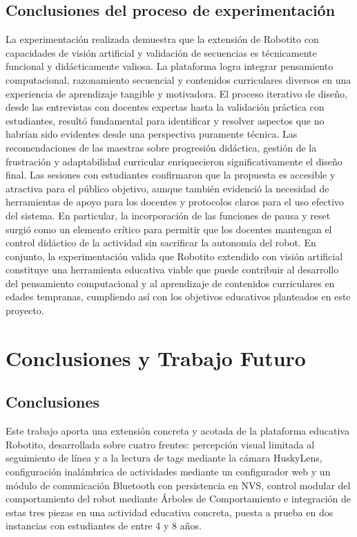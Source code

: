 \documentclass{prgrado}
\begin{document}
\section{Conclusiones del proceso de experimentación}
La experimentación realizada demuestra que la extensión de Robotito con capacidades de visión artificial y validación de secuencias es técnicamente funcional y didácticamente valiosa. La plataforma logra integrar pensamiento computacional, razonamiento secuencial y contenidos curriculares diversos en una experiencia de aprendizaje tangible y motivadora.
El proceso iterativo de diseño, desde las entrevistas con docentes expertas hasta la validación práctica con estudiantes, resultó fundamental para identificar y resolver aspectos que no habrían sido evidentes desde una perspectiva puramente técnica. Las recomendaciones de las maestras sobre progresión didáctica, gestión de la frustración y adaptabilidad curricular enriquecieron significativamente el diseño final.
Las sesiones con estudiantes confirmaron que la propuesta es accesible y atractiva para el público objetivo, aunque también evidenció la necesidad de herramientas de apoyo para los docentes y protocolos claros para el uso efectivo del sistema. En particular, la incorporación de las funciones de pausa y reset surgió como un elemento crítico para permitir que los docentes mantengan el control didáctico de la actividad sin sacrificar la autonomía del robot.
En conjunto, la experimentación valida que Robotito extendido con visión artificial constituye una herramienta educativa viable que puede contribuir al desarrollo del pensamiento computacional y al aprendizaje de contenidos curriculares en edades tempranas, cumpliendo así con los objetivos educativos planteados en este proyecto.




\chapter{Conclusiones y Trabajo Futuro}
\label{cap:conclusiones}
\section{Conclusiones}

Este trabajo aporta una extensión concreta y acotada de la plataforma educativa Robotito, desarrollada sobre cuatro frentes: percepción visual limitada al seguimiento de línea y a la lectura de tags mediante la cámara HuskyLens, configuración inalámbrica de actividades mediante un configurador web y un módulo de comunicación Bluetooth con persistencia en NVS, control modular del comportamiento del robot mediante Árboles de Comportamiento e integración de estas tres piezas en una actividad educativa concreta, puesta a prueba en dos instancias con estudiantes de entre 4 y 8 años.
\end{document}
